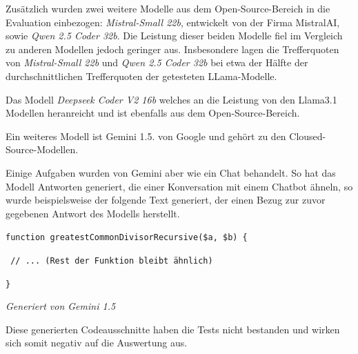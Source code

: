 Zusätzlich wurden zwei weitere Modelle aus dem Open-Source-Bereich in die Evaluation einbezogen: \textit{Mistral-Small 22b}, entwickelt von der Firma MistralAI, sowie \textit{Qwen 2.5 Coder 32b}. Die Leistung dieser beiden Modelle fiel im Vergleich zu anderen Modellen jedoch geringer aus. Insbesondere lagen die Trefferquoten von \textit{Mistral-Small 22b} und \textit{Qwen 2.5 Coder 32b} bei etwa der Hälfte der durchschnittlichen Trefferquoten der getesteten LLama-Modelle.\vspace{0.2cm}

Das Modell \textit{Deepseek Coder V2 16b} welches an die Leistung von den Llama3.1 Modellen heranreicht und ist ebenfalls aus dem Open-Source-Bereich.\vspace{0.2cm}


Ein weiteres Modell ist Gemini 1.5. von Google und gehört zu den Cloused-Source-Modellen. 

Einige Aufgaben wurden von Gemini aber wie ein Chat behandelt. So hat das Modell Antworten generiert, die einer Konversation mit einem Chatbot ähneln, so wurde beispielsweise der folgende Text generiert, der einen Bezug zur zuvor gegebenen Antwort des Modells herstellt.

\hrulefill

\texttt{function greatestCommonDivisorRecursive(\$a, \$b) \{}

\texttt{\hspace{0.6cm} // ... (Rest der Funktion bleibt ähnlich)}

\texttt{\}}

\begin{flushright}
	\textit{Generiert von Gemini 1.5}
\end{flushright}

\hrulefill

Diese generierten Codeausschnitte haben die Tests nicht bestanden und wirken sich somit negativ auf die Auswertung aus.\vspace{0.2cm}


